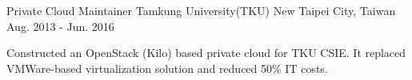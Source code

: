 \begin{cventries}
    \cventry
        {Private Cloud Maintainer}
        {Tamkung University(TKU)}
        {New Taipei City, Taiwan}
        {Aug. 2013 - Jun. 2016}
        {
            \begin{cvitems}
                \item
                    {
                        Constructed an OpenStack (Kilo) based private cloud for TKU CSIE. It replaced VMWare-based virtualization solution and reduced 50\% IT costs.
                    }
            \end{cvitems}
        }

\end{cventries}
